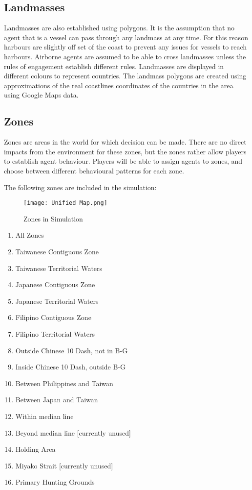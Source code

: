 \documentclass{article}
\begin{document}
\subsection{Landmasses}

Landmasses are also established using polygons. It is the assumption that no agent that is a vessel can pass through any landmass at any time. For this reason harbours are slightly off set of the coast to prevent any issues for vessels to reach harbours. Airborne agents are assumed to be able to cross landmasses unless the rules of engagement establish different rules. Landmasses are displayed in different colours to represent countries. The landmass polygons are created using approximations of the real coastlines coordinates of the countries in the area using Google Maps data. 

\subsection{Zones}

Zones are areas in the world for which decision can be made. There are no direct impacts from the environment for these zones, but the zones rather allow players to establish agent behaviour. Players will be able to assign agents to zones, and choose between different behavioural patterns for each zone.

\noindent The following zones are included in the simulation:

\begin{figure}
    \centering
    \texttt{[image: Unified Map.png]}
    \caption{Zones in Simulation}
    \label{fig:enter-label}
\end{figure}


\begin{enumerate}[label=(\Alph*)]
\item   All Zones
\item	Taiwanese Contiguous Zone
\item	Taiwanese Territorial Waters
\item	Japanese Contiguous Zone
\item	Japanese Territorial Waters
\item	Filipino Contiguous Zone
\item	Filipino Territorial Waters
\item	Outside Chinese 10 Dash, not in B-G
\item	Inside Chinese 10 Dash, outside B-G
\item	Between Philippines and Taiwan
\item	Between Japan and Taiwan
\item	Within median line
\item	Beyond median line [currently unused]
\item	Holding Area
\item	Miyako Strait [currently unused]
\item   Primary Hunting Grounds

\end{enumerate}
\end{document}
